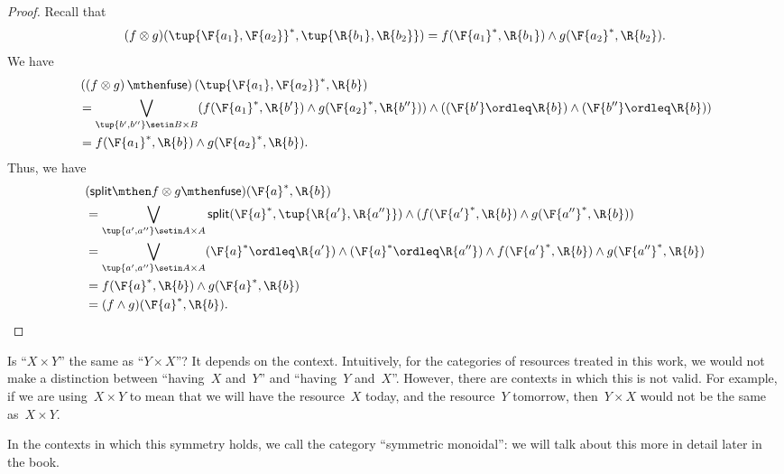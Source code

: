 \begin{proof}
    Recall that
    \begin{equation}
        (f\otimes g)(\tup{\F{a_1},\F{a_2}}^*,\tup{\R{b_1},\R{b_2}})
        =f(\F{a_1}^*,\R{b_1})\wedge g(\F{a_2}^*,\R{b_2}).
    \end{equation}
    We have
    \begin{equation}
        \begin{aligned}
             & \left(\left(f\otimes g\right) \mthen \mathsf{fuse}\right)(\tup{\F{a_1},\F{a_2}}^*,\R{b}) \\
             & =\bigvee_{\tup{b',b''}\setin B\times B}(f(\F{a_1}^*,\R{b'})\wedge g(\F{a_2}^*,\R{b''}))\wedge ((\F{b'}\ordleq \R{b}) \wedge (\F{b''}\ordleq \R{b})) \\
             & =f(\F{a_1}^*,\R{b})\wedge g(\F{a_2}^*,\R{b}).
        \end{aligned}
    \end{equation}
    Thus, we have
    \begin{equation}
        \begin{aligned}
             & (\mathsf{split}\mthen f\otimes g\mthen \mathsf{fuse})(\F{a}^*,\R{b}) \\&=\bigvee_{\tup{a',a''}\setin A\times A} \mathsf{split}(\F{a}^*,\tup{\R{a'},\R{a''}})\wedge (f(\F{a'}^*,\R{b})\wedge g(\F{a''}^*,\R{b}))\\
             & =\bigvee_{\tup{a',a''}\setin A\times A}(\F{a}^*\ordleq \R{a'})\wedge (\F{a}^*\ordleq \R{a''})\wedge f(\F{a'}^*,\R{b})\wedge g(\F{a''}^*,\R{b}) \\
             & =f(\F{a}^*,\R{b})\wedge g(\F{a}^*,\R{b}) \\
             & =(f\wedge g)(\F{a}^*,\R{b}).
        \end{aligned}
    \end{equation}
\end{proof}

Is ``$X \times Y$'' the same as ``$Y \times X$''?
It depends on the context.
Intuitively, for the categories of resources treated in this work, we would not make a distinction between ``having~$X$ and~$Y$'' and ``having~$Y$ and~$X$''.
However, there are contexts in which this is not valid.
For example, if we are using~$X \times Y$ to mean that we will have the resource~$X$ today, and the resource~$Y$ tomorrow, then~$Y \times X$ would not be the same as~$X \times Y$.

In the contexts in which this symmetry holds, we call the category ``symmetric monoidal'': we will talk about this more in detail later in the book.

